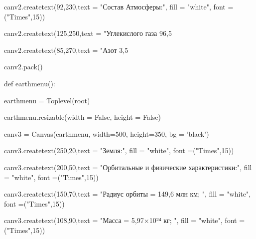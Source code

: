 \documentclass[14pt, oneside]{SavkinSeliverstov}
\begin{document}
	canv\underline{\hspace{0.2cm}}2.create\underline{\hspace{0.2cm}}text(92,230,text = "Состав Атмосферы:", fill = "white", font =("Times",15))
	
	canv\underline{\hspace{0.2cm}}2.create\underline{\hspace{0.2cm}}text(125,250,text = "Углекислого газа 96,5 %
	
	canv\underline{\hspace{0.2cm}}2.create\underline{\hspace{0.2cm}}text(85,270,text = "Азот 3,5%
	
	canv\underline{\hspace{0.2cm}}2.pack()
	
def earth\underline{\hspace{0.2cm}}menu():

	earth\underline{\hspace{0.2cm}}menu = Toplevel(root)
	
	earth\underline{\hspace{0.2cm}}menu.resizable(width = False, height = False)

	canv\underline{\hspace{0.2cm}}3 = Canvas(earth\underline{\hspace{0.2cm}}menu, width=500, height=350, bg = 'black')

	canv\underline{\hspace{0.2cm}}3.create\underline{\hspace{0.2cm}}text(250,20,text = "Земля:", fill = "white", font =("Times",15))
	
	canv\underline{\hspace{0.2cm}}3.create\underline{\hspace{0.2cm}}text(200,50,text = "Орбитальные и физические характеристики:", fill = "white", font =("Times",15))
	
	canv\underline{\hspace{0.2cm}}3.create\underline{\hspace{0.2cm}}text(150,70,text = "Радиус орбиты = 149,6 млн км; ", fill = "white", font =("Times",15))
	
	canv\underline{\hspace{0.2cm}}3.create\underline{\hspace{0.2cm}}text(108,90,text = "Масса = 5,97×10²⁴ кг; ", fill = "white", font =("Times",15))
\end{document}
